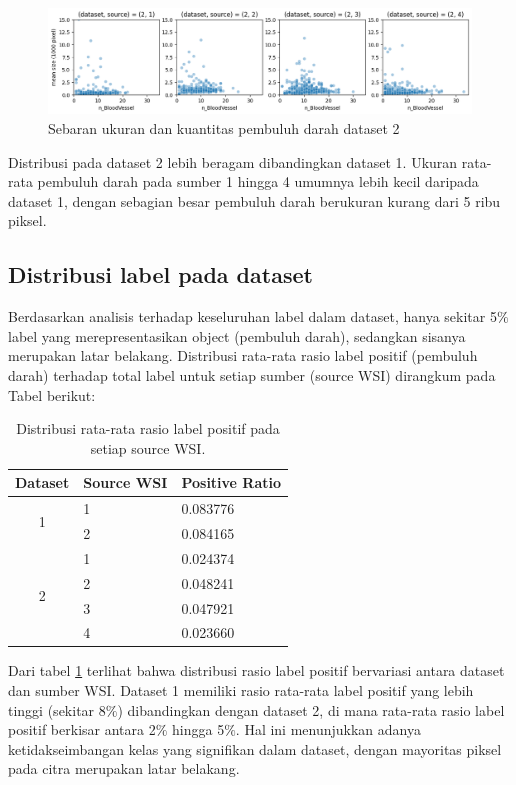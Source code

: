 \begin{figure}[h]
	\centering
	\includegraphics[width=\textwidth]{gambar/bab4/sct_2.png}
	\caption{Sebaran ukuran dan kuantitas pembuluh darah dataset 2}
	\label{fig:sct_2}
\end{figure}

\noindent Distribusi pada dataset 2 lebih beragam dibandingkan dataset 1. Ukuran rata-rata pembuluh darah pada sumber 1 hingga 4 umumnya lebih kecil daripada dataset 1, dengan sebagian besar pembuluh darah berukuran kurang dari 5 ribu piksel.


\subsection{Distribusi label pada dataset}
\noindent Berdasarkan analisis terhadap keseluruhan label dalam dataset, hanya sekitar 5$\%$ label yang merepresentasikan object (pembuluh darah), sedangkan sisanya merupakan latar belakang. Distribusi rata-rata rasio label positif (pembuluh darah) terhadap total label untuk setiap sumber (source WSI) dirangkum pada Tabel berikut:


\begin{table}[H]
	\centering
	\caption{Distribusi rata-rata rasio label positif pada setiap source WSI.}
	\label{tab:distribusi_label}
	\begin{tabular}{cll}
		\hline
		\multicolumn{1}{l}{Dataset} & Source WSI & Positive Ratio \\ \hline
		\multirow{2}{*}{1}          & 1          & 0.083776      \\
		& 2          & 0.084165       \\ \hline
		\multirow{4}{*}{2}          & 1          & 0.024374       \\
		& 2          & 0.048241       \\
		& 3          & 0.047921       \\
		& 4          & 0.023660       \\ \hline
	\end{tabular}
\end{table}

\noindent Dari tabel \ref{tab:distribusi_label} terlihat bahwa distribusi rasio label positif bervariasi antara dataset dan sumber WSI. Dataset 1 memiliki rasio rata-rata label positif yang lebih tinggi (sekitar 8$\%$) dibandingkan dengan dataset 2, di mana rata-rata rasio label positif berkisar antara 2$\%$ hingga 5$\%$. Hal ini menunjukkan adanya ketidakseimbangan kelas yang signifikan dalam dataset, dengan mayoritas piksel pada citra merupakan latar belakang.



